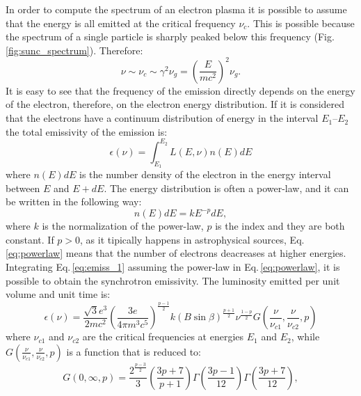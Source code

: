 \documentclass[../main.tex]{subfiles}
\begin{document}
In order to compute the spectrum of an electron plasma it is possible to assume that the energy is all emitted at the critical frequency $\nu_c$. 
This is possible because the spectrum of a single particle is sharply peaked below this frequency (Fig.\,\ref{fig:sunc_spectrum}).
Therefore:
\begin{equation}
    \label{eq: new_crit_freq}
    \nu \sim \nu_c\sim \gamma^2 \nu_g = \left(\frac{E}{mc^2}\right)^2\nu_g.
\end{equation}
It is easy to see that the frequency of the emission directly depends on the energy of the electron, therefore, on the electron energy distribution.
If it is considered that the electrons have a continuum distribution of energy in the interval $E_1$--$E_2$ the total emissivity of the emission is:
\begin{equation}
    \label{eq:emiss_1}
    \epsilon(\nu) = \int_{E_1}^{E_2} L(E,\nu) n(E)dE
\end{equation}
where $n(E)dE$ is the number density of the electron in the energy interval between $E$ and $E+dE$.
The energy distribution is often a power-law, and it can be written in the following way:
\begin{equation}
    \label{eq:powerlaw}
    n(E)dE=kE^{-p}dE,
\end{equation}
where $k$ is the normalization of the power-law, $p$ is the index and they are both constant.
If $p>0$, as it tipically happens in astrophysical sources, Eq.\,\ref{eq:powerlaw} means that the number of electrons deacreases at higher energies.
Integrating Eq.\,\ref{eq:emiss_1} assuming the power-law in Eq.\,\ref{eq:powerlaw}, it is possible to obtain the synchrotron emissivity. 
The luminosity emitted per unit volume and unit time is:
\begin{equation}
    \label{eq:emiss_2}
    \epsilon(\nu)=\frac{\sqrt{3}e^3}{2mc^2}\left(\frac{3e}{4\pi m^3 c^5}\right)^{\frac{p-1}{2}}k\left(B\sin\beta\right)^{\frac{p+1}{2}}\nu^{\frac{1-p}{2}}G\left(\frac{\nu}{\nu_{c1}},\frac{\nu}{\nu_{c2}},p\right)
\end{equation}
where $\nu_{c1}$ and $\nu_{c2}$ are the critical frequencies at energies $E_1$ and $E_2$, while $G\left(\frac{\nu}{\nu_{c1}},\frac{\nu}{\nu_{c2}},p\right)$ is a function that is reduced to:
\begin{equation}
    \label{eq:G}
    G\left(0,\infty,p\right) = \frac{2^{\frac{p-3}{2}}}{3}\left(\frac{3p+7}{p+1}\right)\Gamma\left(\frac{3p-1}{12}\right)\Gamma\left(\frac{3p+7}{12}\right),
\end{equation}
\end{document}
